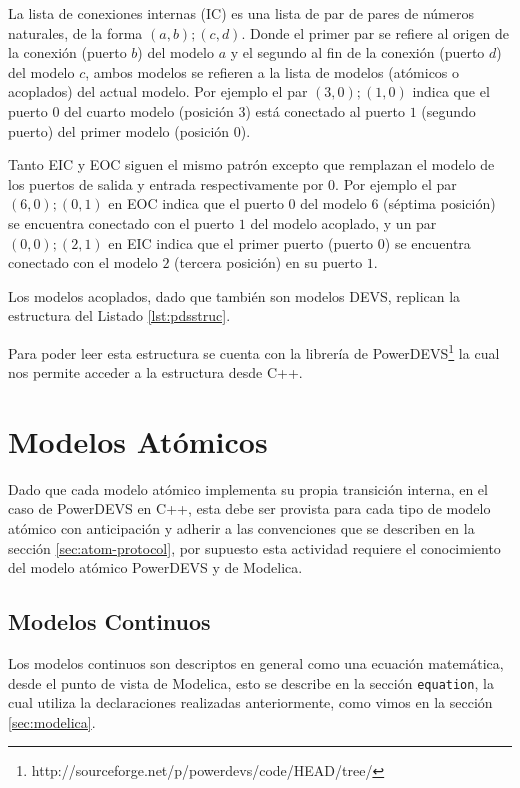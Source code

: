         La lista de conexiones internas (IC) es una lista de par de pares de números naturales, de la forma $(a,b);(c,d)$.
        Donde el primer par se refiere al origen de la conexión (puerto $b$) del modelo $a$ y el segundo al fin de la conexión (puerto $d$) 
        del modelo $c$, ambos modelos se refieren a la lista de modelos (atómicos o acoplados) del actual modelo.
        Por ejemplo el par $(3,0);(1,0)$ indica que el puerto $0$ del cuarto modelo (posición $3$) está conectado al puerto $1$ (segundo puerto) del primer 
	modelo (posición $0$).

        Tanto EIC y EOC siguen el mismo patrón excepto que remplazan el modelo de los puertos de salida y entrada respectivamente por $0$. Por ejemplo el par 
        $(6,0);(0,1)$ en EOC indica que el puerto $0$ del modelo $6$ (séptima posición)  se encuentra conectado con el puerto $1$ del modelo 
        acoplado, y un par $(0,0);(2,1)$ en EIC indica que el primer puerto (puerto $0$) se encuentra conectado con el modelo $2$ (tercera posición) en su puerto $1$.

        Los modelos acoplados, dado que también son modelos DEVS, replican la estructura del Listado \ref{lst:pdsstruc}.

        Para poder leer esta estructura se cuenta con la librería de PowerDEVS\footnote{http://sourceforge.net/p/powerdevs/code/HEAD/tree/} la cual nos permite acceder
        a la estructura desde C++. 

\section{Modelos Atómicos}
        

	Dado que cada modelo atómico implementa su propia transición interna, en el caso de PowerDEVS en C++, esta  debe ser provista para cada tipo de 
	modelo atómico con anticipación y adherir a las convenciones que se describen en la sección \ref{sec:atom-protocol}, por supuesto esta actividad requiere el conocimiento del modelo atómico PowerDEVS y de Modelica.

\subsection{Modelos Continuos}

	Los modelos continuos son descriptos en general como una ecuación matemática, desde el punto de vista de Modelica, esto se describe en la sección 
	\texttt{equation}, la cual utiliza la declaraciones realizadas anteriormente, como vimos en la sección \ref{sec:modelica}.

